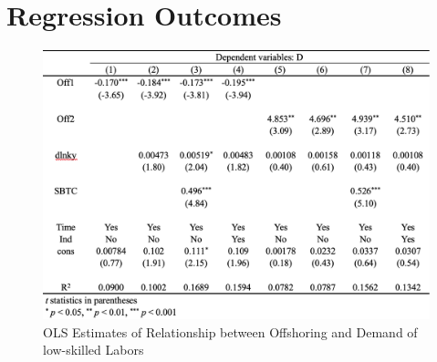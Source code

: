 \documentclass{article}
\begin{document}
\section{Regression Outcomes}
\begin{figure}
\centering
\includegraphics[width=1\textwidth]{Screen Shot 2021-05-24 at 21.56.19.png}
\caption{\label{fig:3}OLS Estimates of Relationship between Offshoring and Demand of low-skilled Labors}
\end{figure}
\end{document}
